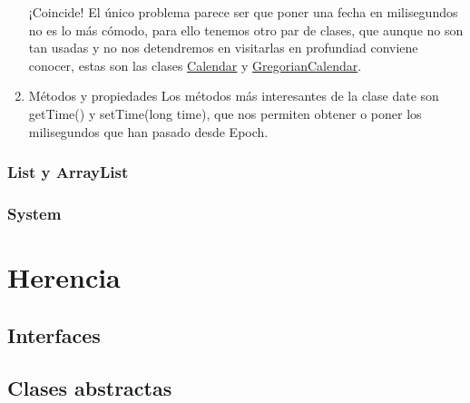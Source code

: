 \documentclass[11pt]{article}
\begin{document}
\begin{enumerate}
¡Coincide! El único problema parece ser que poner una fecha en milisegundos no es lo más cómodo, para ello tenemos otro par de clases, que aunque no son tan usadas y no nos detendremos en visitarlas en profundiad conviene conocer, estas son las clases \href{https://docs.oracle.com/javase/7/docs/api/java/util/Calendar.html}{Calendar} y \href{https://docs.oracle.com/javase/7/docs/api/java/util/GregorianCalendar.html}{GregorianCalendar}.

\item Métodos y propiedades
\label{sec:org0b43bd6}
Los métodos más interesantes de la clase date son getTime() y setTime(long time), que nos permiten obtener o poner los milisegundos que han pasado desde Epoch.
\end{enumerate}

\subsubsection{List y ArrayList}
\label{sec:orgd0db2d7}
\subsubsection{System}
\label{sec:org6ce38df}
\section{Herencia}
\label{sec:org937d412}
\subsection{Interfaces}
\label{sec:org0f67e4b}
\subsection{Clases abstractas}
\label{sec:org3384a38}
\end{document}
